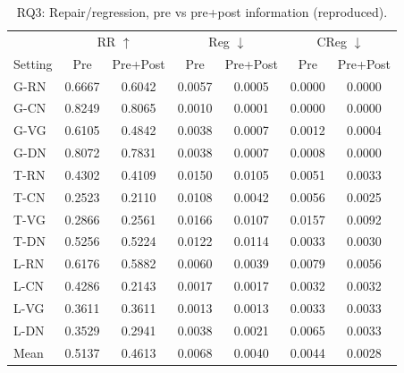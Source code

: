 \documentclass{article}
\begin{document}
\begin{table}[h]
\centering
\caption{RQ3: Repair/regression, pre vs pre+post information (reproduced).}
\label{tab:repro_rq3_gate_effect}
\small
\begin{tabular}{lcccccc}
\toprule
& \multicolumn{2}{c}{RR $\uparrow$} & \multicolumn{2}{c}{Reg $\downarrow$} & \multicolumn{2}{c}{CReg $\downarrow$} \\
Setting & Pre & Pre+Post & Pre & Pre+Post & Pre & Pre+Post \\
\midrule
G-RN & 0.6667 & 0.6042 & 0.0057 & 0.0005 & 0.0000 & 0.0000 \\
G-CN & 0.8249 & 0.8065 & 0.0010 & 0.0001 & 0.0000 & 0.0000 \\
G-VG & 0.6105 & 0.4842 & 0.0038 & 0.0007 & 0.0012 & 0.0004 \\
G-DN & 0.8072 & 0.7831 & 0.0038 & 0.0007 & 0.0008 & 0.0000 \\
T-RN & 0.4302 & 0.4109 & 0.0150 & 0.0105 & 0.0051 & 0.0033 \\
T-CN & 0.2523 & 0.2110 & 0.0108 & 0.0042 & 0.0056 & 0.0025 \\
T-VG & 0.2866 & 0.2561 & 0.0166 & 0.0107 & 0.0157 & 0.0092 \\
T-DN & 0.5256 & 0.5224 & 0.0122 & 0.0114 & 0.0033 & 0.0030 \\
L-RN & 0.6176 & 0.5882 & 0.0060 & 0.0039 & 0.0079 & 0.0056 \\
L-CN & 0.4286 & 0.2143 & 0.0017 & 0.0017 & 0.0032 & 0.0032 \\
L-VG & 0.3611 & 0.3611 & 0.0013 & 0.0013 & 0.0033 & 0.0033 \\
L-DN & 0.3529 & 0.2941 & 0.0038 & 0.0021 & 0.0065 & 0.0033 \\
\midrule
Mean & 0.5137 & 0.4613 & 0.0068 & 0.0040 & 0.0044 & 0.0028 \\
\bottomrule
\end{tabular}
\end{table}
\end{document}
